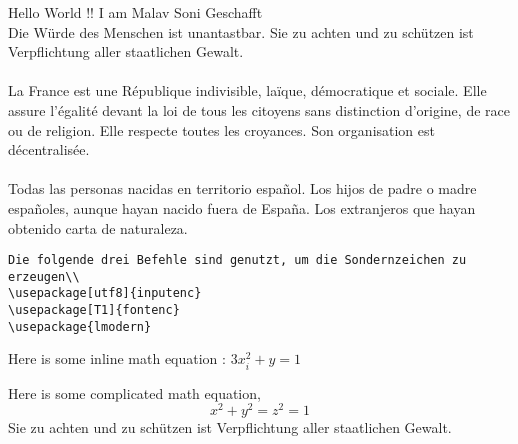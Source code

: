 \documentclass{article}
\begin{document}
Hello World !!  I am Malav Soni
Geschafft\\
Die Würde des Menschen ist unantastbar. Sie zu achten und zu schützen ist Verpflichtung aller
staatlichen Gewalt.\\
\\
La France est une République indivisible, laïque, démocratique et sociale. Elle assure l’égalité
devant la loi de tous les citoyens sans distinction d’origine, de race ou de religion. Elle respecte
toutes les croyances. Son organisation est décentralisée.\\
\\
Todas las personas nacidas en territorio español. Los hijos de padre o madre españoles, aunque
hayan nacido fuera de España. Los extranjeros que hayan obtenido carta de naturaleza.
\begin{verbatim}
Die folgende drei Befehle sind genutzt, um die Sondernzeichen zu erzeugen\\
\usepackage[utf8]{inputenc}
\usepackage[T1]{fontenc}
\usepackage{lmodern}
\end{verbatim}
Here is some inline math equation : $3x^2_i+y=1$

Here is some complicated math equation,
$$x^2 + y^2 =z^2 = 1$$
 Sie zu achten und zu schützen ist Verpflichtung aller
staatlichen Gewalt.
\end{document}

